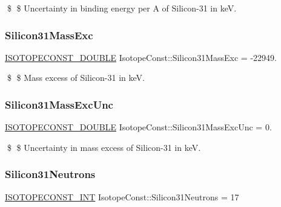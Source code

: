 \$ \$ Uncertainty in binding energy per A of Silicon-\/31 in keV. \mbox{\label{group___isotope_const-_silicon-_si31_ga08e8847678350a79cb8b199ccce27b9f}} 
\subsubsection{\texorpdfstring{Silicon31\+Mass\+Exc}{Silicon31MassExc}}
{\footnotesize\ttfamily \mbox{\hyperlink{group___isotope_const-_macros_ga8f45a7272ce02c0b4c65c44636ed719a}{I\+S\+O\+T\+O\+P\+E\+C\+O\+N\+S\+T\+\_\+\+D\+O\+U\+B\+LE}} Isotope\+Const\+::\+Silicon31\+Mass\+Exc = -\/22949.}

\$ \$ Mass excess of Silicon-\/31 in keV. \mbox{\label{group___isotope_const-_silicon-_si31_ga97b6bc83bdaf4a21e859ede3fd268972}} 
\subsubsection{\texorpdfstring{Silicon31\+Mass\+Exc\+Unc}{Silicon31MassExcUnc}}
{\footnotesize\ttfamily \mbox{\hyperlink{group___isotope_const-_macros_ga8f45a7272ce02c0b4c65c44636ed719a}{I\+S\+O\+T\+O\+P\+E\+C\+O\+N\+S\+T\+\_\+\+D\+O\+U\+B\+LE}} Isotope\+Const\+::\+Silicon31\+Mass\+Exc\+Unc = 0.}

\$ \$ Uncertainty in mass excess of Silicon-\/31 in keV. \mbox{\label{group___isotope_const-_silicon-_si31_ga4586f3711d22cb8bce9b62813b1e9ccc}} 
\subsubsection{\texorpdfstring{Silicon31\+Neutrons}{Silicon31Neutrons}}
{\footnotesize\ttfamily \mbox{\hyperlink{group___isotope_const-_macros_ga5f18360b3e99483a35c32d789e62621c}{I\+S\+O\+T\+O\+P\+E\+C\+O\+N\+S\+T\+\_\+\+I\+NT}} Isotope\+Const\+::\+Silicon31\+Neutrons = 17}

